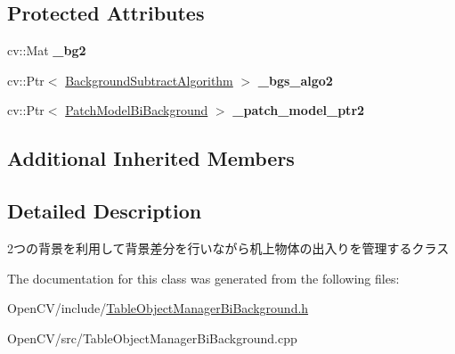 \subsection*{Protected Attributes}
\begin{DoxyCompactItemize}
\item 
\hypertarget{classskl_1_1_table_object_manager_bi_background_a630f4ad3a4c83b25c667cce5f4ee63aa}{}\label{classskl_1_1_table_object_manager_bi_background_a630f4ad3a4c83b25c667cce5f4ee63aa} 
cv\+::\+Mat {\bfseries \+\_\+bg2}
\item 
\hypertarget{classskl_1_1_table_object_manager_bi_background_a3797cfa1877c52118d44f37b5059e29c}{}\label{classskl_1_1_table_object_manager_bi_background_a3797cfa1877c52118d44f37b5059e29c} 
cv\+::\+Ptr$<$ \hyperlink{classskl_1_1_background_subtract_algorithm}{Background\+Subtract\+Algorithm} $>$ {\bfseries \+\_\+bgs\+\_\+algo2}
\item 
\hypertarget{classskl_1_1_table_object_manager_bi_background_aa75a91916b64a30ed728eca33da906a4}{}\label{classskl_1_1_table_object_manager_bi_background_aa75a91916b64a30ed728eca33da906a4} 
cv\+::\+Ptr$<$ \hyperlink{classskl_1_1_patch_model_bi_background}{Patch\+Model\+Bi\+Background} $>$ {\bfseries \+\_\+patch\+\_\+model\+\_\+ptr2}
\end{DoxyCompactItemize}
\subsection*{Additional Inherited Members}


\subsection{Detailed Description}
2つの背景を利用して背景差分を行いながら机上物体の出入りを管理するクラス 

The documentation for this class was generated from the following files\+:\begin{DoxyCompactItemize}
\item 
Open\+C\+V/include/\hyperlink{_table_object_manager_bi_background_8h}{Table\+Object\+Manager\+Bi\+Background.\+h}\item 
Open\+C\+V/src/Table\+Object\+Manager\+Bi\+Background.\+cpp\end{DoxyCompactItemize}
